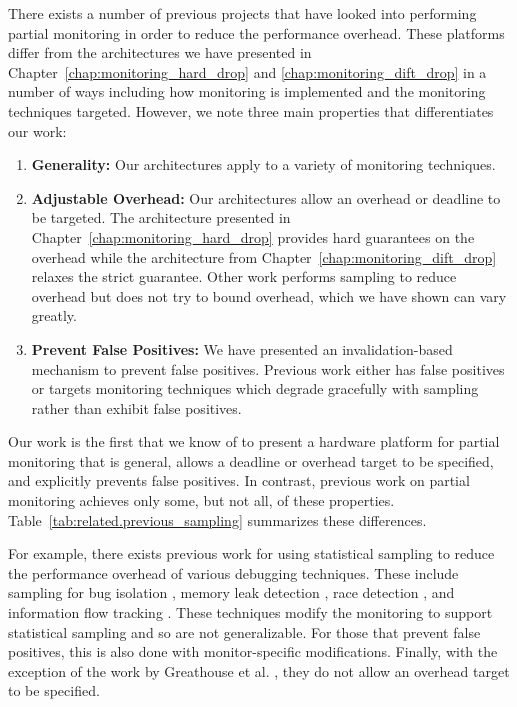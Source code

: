 There exists a number of previous projects that have looked into performing
partial monitoring in order to reduce the performance overhead. These platforms
differ from the architectures we have presented in
Chapter~\ref{chap:monitoring_hard_drop} and \ref{chap:monitoring_dift_drop} in a
number of ways including how monitoring is implemented and the monitoring
techniques targeted. However, we note three main properties that differentiates
our work:
\begin{enumerate}
  \item \textbf{Generality:} Our architectures apply to a variety of
  monitoring techniques.
  \item \textbf{Adjustable Overhead:} Our architectures allow an overhead or
  deadline to be targeted. The architecture presented in
  Chapter~\ref{chap:monitoring_hard_drop} provides hard guarantees on the
  overhead while the architecture from Chapter~\ref{chap:monitoring_dift_drop}
  relaxes the strict guarantee. Other work performs sampling to reduce overhead
  but does not try to bound overhead, which we have shown can vary greatly.
  \item \textbf{Prevent False Positives:} We have presented an
  invalidation-based mechanism to prevent false positives. Previous work either
  has false positives or targets monitoring techniques which degrade gracefully
  with sampling rather than exhibit false positives.
\end{enumerate}
Our work is the first that we know of to present a hardware platform for
partial monitoring that is general, allows a deadline or overhead target to be
specified, and explicitly prevents false positives. In contrast, previous work
on partial monitoring achieves only some, but not all, of these properties.
Table~\ref{tab:related.previous_sampling} summarizes these differences. 

For example, there exists previous work for using statistical sampling to
reduce the performance overhead of various debugging techniques. These include
sampling for bug isolation \cite{liblit-pldi05}, memory leak detection
\cite{chilimbi-asplos04}, race detection \cite{literace-pldi09, pacer-pldi10},
and information flow tracking \cite{testudo-micro08, greathouse-cgo11}. These
techniques modify the monitoring to support statistical sampling and so are not
generalizable. For those that prevent false positives, this is also done with
monitor-specific modifications. Finally, with the exception of the work by
Greathouse et al. \cite{greathouse-cgo11}, they do not allow an overhead target
to be specified.

